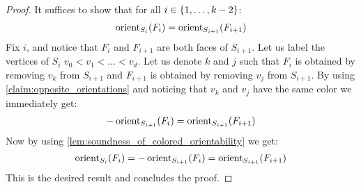 \begin{proof}
	It suffices to show that for all $i \in \left\{1, \dots, k-2\right\}$:
	\begin{align*}
		\operatorname{orient}_{S_i}(F_i) =  \operatorname{orient}_{S_{i+1}}(F_{i+1})
	\end{align*}
	Fix $i$, and notice that $F_i$ and $F_{i+1}$ are both faces of $S_{i+1}$. Let us label the vertices of $S_i$ $v_0 < v_1 < \dots < v_d$. Let us denote $k$ and $j$ such that $F_i$ is obtained by removing $v_k$ from $S_{i+1}$ and $F_{i+1}$ is obtained by removing $v_j$ from $S_{i+1}$.
	By using \cref{claim:opposite_orientations} and noticing that $v_k$ and $v_j$ have the same color  we immediately get:
	\begin{align*}
		- \operatorname{orient}_{S_{i+1}}(F_i) =  \operatorname{orient}_{S_{i+1}}(F_{i+1})
	\end{align*}
	Now by using \cref{lem:soundness_of_colored_orientability} we get:
	\begin{align*}
		\operatorname{orient}_{S_i}(F_i) = - \operatorname{orient}_{S_{i+1}}(F_i) =  \operatorname{orient}_{S_{i+1}}(F_{i+1})
	\end{align*}
	This is the desired result and concludes the proof.
\end{proof}

